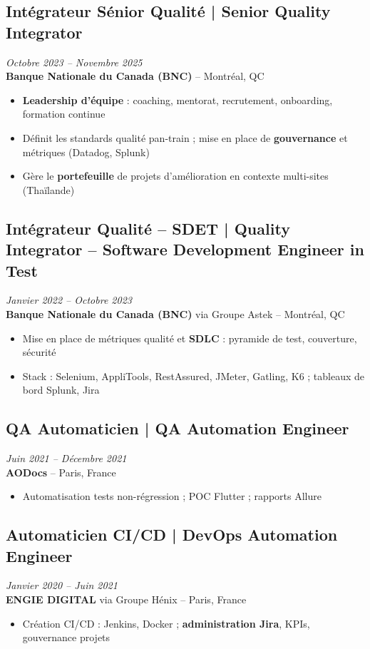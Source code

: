 \documentclass[11pt,a4paper]{article}
\begin{document}
\subsection*{Intégrateur Sénior Qualité | Senior Quality Integrator} \hfill \textit{Octobre 2023 -- Novembre 2025}\\
\textbf{Banque Nationale du Canada (BNC)} -- Montréal, QC
\begin{itemize}
    \item \textbf{Leadership d'équipe} : coaching, mentorat, recrutement, onboarding, formation continue
    \item Définit les standards qualité pan-train ; mise en place de \textbf{gouvernance} et métriques (Datadog, Splunk)
    \item Gère le \textbf{portefeuille} de projets d'amélioration en contexte multi-sites (Thaïlande)
\end{itemize}

\subsection*{Intégrateur Qualité -- SDET | Quality Integrator -- Software Development Engineer in Test} \hfill \textit{Janvier 2022 -- Octobre 2023}\\
\textbf{Banque Nationale du Canada (BNC)} via Groupe Astek -- Montréal, QC
\begin{itemize}
    \item Mise en place de métriques qualité et \textbf{SDLC} : pyramide de test, couverture, sécurité
    \item Stack : Selenium, AppliTools, RestAssured, JMeter, Gatling, K6 ; tableaux de bord Splunk, Jira
\end{itemize}

\subsection*{QA Automaticien | QA Automation Engineer} \hfill \textit{Juin 2021 -- Décembre 2021}\\
\textbf{AODocs} -- Paris, France
\begin{itemize}
    \item Automatisation tests non-régression ; POC Flutter ; rapports Allure
\end{itemize}

\subsection*{Automaticien CI/CD | DevOps Automation Engineer} \hfill \textit{Janvier 2020 -- Juin 2021}\\
\textbf{ENGIE DIGITAL} via Groupe Hénix -- Paris, France
\begin{itemize}
    \item Création CI/CD : Jenkins, Docker ; \textbf{administration Jira}, KPIs, gouvernance projets
\end{itemize}
\end{document}

